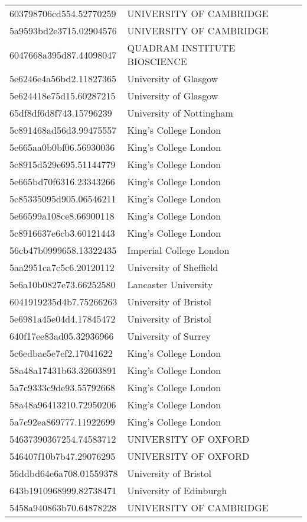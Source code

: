 \begin{tabular}{ll}
603798706cd554.52770259 & UNIVERSITY OF CAMBRIDGE \\
5a9593bd2e3715.02904576 & UNIVERSITY OF CAMBRIDGE \\
6047668a395d87.44098047 & QUADRAM INSTITUTE BIOSCIENCE \\
5e6246e4a56bd2.11827365 & University of Glasgow \\
5e624418e75d15.60287215 & University of Glasgow \\
65df8df6d8f743.15796239 & University of Nottingham \\
5c891468ad56d3.99475557 & King's College London \\
5e665aa0b0bf06.56930036 & King's College London \\
5c8915d529e695.51144779 & King's College London \\
5e665bd70f6316.23343266 & King's College London \\
5c85335095d905.06546211 & King's College London \\
5e66599a108ce8.66900118 & King's College London \\
5c8916637e6cb3.60121443 & King's College London \\
56cb47b0999658.13322435 & Imperial College London \\
5aa2951ca7c5c6.20120112 & University of Sheffield \\
5e6a10b0827e73.66252580 & Lancaster University \\
6041919235d4b7.75266263 & University of Bristol \\
5e6981a45e04d4.17845472 & University of Bristol \\
640f17ee83ad05.32936966 & University of Surrey \\
5c6edbae5e7ef2.17041622 & King's College London \\
58a48a17431b63.32603891 & King's College London \\
5a7c9333c9de93.55792668 & King's College London \\
58a48a96413210.72950206 & King's College London \\
5a7c92ea869777.11922699 & King's College London \\
54637390367254.74583712 & UNIVERSITY OF OXFORD \\
546407f10b7b47.29076295 & UNIVERSITY OF OXFORD \\
56ddbd64e6a708.01559378 & University of Bristol \\
643b1910968999.82738471 & University of Edinburgh \\
5458a940863b70.64878228 & UNIVERSITY OF CAMBRIDGE \\

\end{tabular}

